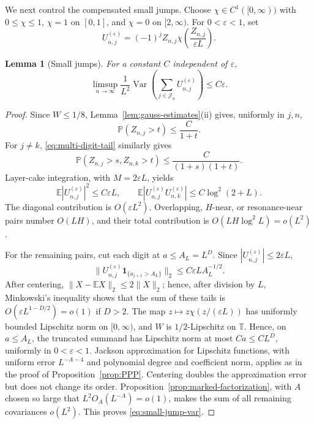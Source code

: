 \documentclass[11pt,a4paper]{amsart}
\newtheorem{lemma}[theorem]{Lemma}
\theoremstyle{definition}
\theoremstyle{remark}
\newcommand{\T}{\mathbb T}
\newcommand{\E}{\mathbb E}
\newcommand{\Pp}{\mathbb P}
\newcommand{\ind}{\mathbf 1}
\newcommand{\Var}{\operatorname{Var}}
\begin{document}
We next control the compensated small jumps.  Choose
$\chi\in C^1([0,\infty))$ with $0\le\chi\le1$, $\chi=1$ on $[0,1]$, and
$\chi=0$ on $[2,\infty)$.  For $0<\varepsilon<1$, set
\begin{equation}\label{eq:small-jump-U}
 U_{n,j}^{(\varepsilon)}=(-1)^jZ_{n,j}
 \chi\!\left(\frac{Z_{n,j}}{\varepsilon L}\right).
\end{equation}

\begin{lemma}[Small jumps]\label{lem:small-jumps}
For a constant $C$ independent of $\varepsilon$,
\begin{equation}\label{eq:small-jump-var}
 \limsup_{n\to\infty}\frac1{L^2}
 \Var\left(\sum_{j\in\mathcal J_n}U_{n,j}^{(\varepsilon)}\right)
 \le C\varepsilon.
\end{equation}
\end{lemma}

\begin{proof}
Since $W\le1/8$, Lemma~\ref{lem:gauss-estimates}(ii) gives, uniformly in
$j,n$,
\[
 \Pp(Z_{n,j}>t)\le\frac{C}{1+t}.
\]
For $j\ne k$, \eqref{eq:multi-digit-tail} similarly gives
\[
 \Pp(Z_{n,j}>s,Z_{n,k}>t)
 \le\frac{C}{(1+s)(1+t)}.
\]
Layer-cake integration, with $M=2\varepsilon L$, yields
\begin{equation}\label{eq:small-moments}
 \E|U_{n,j}^{(\varepsilon)}|^2\le C\varepsilon L,
 \qquad
 \E|U_{n,j}^{(\varepsilon)}U_{n,k}^{(\varepsilon)}|
 \le C\log^2(2+L).
\end{equation}
The diagonal contribution is $O(\varepsilon L^2)$.  Overlapping,
$H$-near, or resonance-near pairs number $O(LH)$, and their total
contribution is $O(LH\log^2L)=o(L^2)$.

For the remaining pairs, cut each digit at $a\le A_L=L^D$.  Since
$|U_{n,j}^{(\varepsilon)}|\le2\varepsilon L$,
\[
 \|U_{n,j}^{(\varepsilon)}\ind_{\{a_{j+1}>A_L\}}\|_2
 \le C\varepsilon L A_L^{-1/2}.
\]
After centering, $\|X-\E X\|_2\le2\|X\|_2$; hence, after division by $L$,
Minkowski's inequality shows that the sum of these tails is
$O(\varepsilon L^{1-D/2})=o(1)$ if $D>2$.  The map
$z\mapsto z\chi(z/(\varepsilon L))$ has uniformly bounded Lipschitz norm on
$[0,\infty)$, and $W$ is $1/2$-Lipschitz on $\T$.  Hence, on $a\le A_L$,
the truncated summand has Lipschitz norm at most $Ca\le CL^D$, uniformly in
$0<\varepsilon<1$.  Jackson approximation for Lipschitz functions, with
uniform error $L^{-A-4}$ and polynomial degree and coefficient norm, applies
as in the proof of Proposition~\ref{prop:PPP}.
Centering doubles the approximation error but does not change its order.
Proposition~\ref{prop:marked-factorization},
with $A$ chosen so large that $L^2O_A(L^{-A})=o(1)$, makes the sum of all
remaining covariances $o(L^2)$.  This proves
\eqref{eq:small-jump-var}.
\end{proof}
\end{document}
